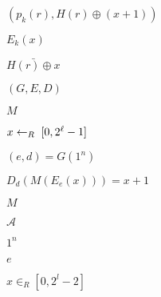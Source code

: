 \documentclass[10pt]{book}
\begin{document}
\begin{mdSnippets}
\begin{mdInlineSnippet}[0e9b360927d7711cd3205288624ad5db]
$(p_k(r), H(r) \oplus (x + 1))$\end{mdInlineSnippet}%
\begin{mdInlineSnippet}%
$E_k(x)$\end{mdInlineSnippet}%
\begin{mdInlineSnippet}[d67324c21cc2be432d0ff0845f47bc90]%
$\bar{H(r) \oplus x}$\end{mdInlineSnippet}%
\begin{mdInlineSnippet}[b85e5fef323d7d3cb0465e35e6d6d405]%
$(G,E,D)$\end{mdInlineSnippet}%
\begin{mdInlineSnippet}[69691c7bdcc3ce6d5d8a1361f22d04ac]%
$M$\end{mdInlineSnippet}%
\begin{mdInlineSnippet}%
$x\leftarrow_R\; [0,2^{\ell}-1]$\end{mdInlineSnippet}%
\begin{mdInlineSnippet}%
$(e,d)=G(1^n)$\end{mdInlineSnippet}%
\begin{mdInlineSnippet}%
$D_d(M(E_e(x)))=x+1$\end{mdInlineSnippet}%
\begin{mdInlineSnippet}[69691c7bdcc3ce6d5d8a1361f22d04ac]%
$M$\end{mdInlineSnippet}%
\begin{mdInlineSnippet}[ad70146b431bea9ae74cf8385470c544]%
$\mathcal{A}$\end{mdInlineSnippet}%
\begin{mdInlineSnippet}%
$1^n$\end{mdInlineSnippet}%
\begin{mdInlineSnippet}[e1671797c52e15f763380b45e841ec32]%
$e$\end{mdInlineSnippet}%
\begin{mdInlineSnippet}[9c2f7ab40d4b0adcdb170c95e039de07]%
$x \in_R [0,2^l - 2]$\end{mdInlineSnippet}%
\begin{mdInlineSnippet}%

\end{mdInlineSnippet}
\end{mdSnippets}
\end{document}

